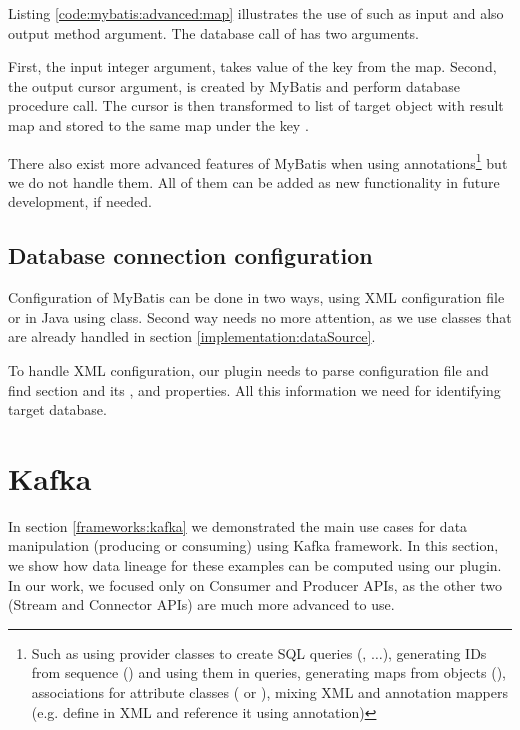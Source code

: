 Listing \ref{code:mybatis:advanced:map} illustrates the use of such  as
input and also output method argument.
The database call of  has two arguments.

First, the input integer argument, takes value of the  key from the map.
Second, the output cursor argument, is created by MyBatis and perform database procedure call.
The cursor is then transformed to list of target object
with result map  and stored to the same map under the key .



There also exist more advanced features of MyBatis when using annotations\footnote{
  Such as using provider classes to create SQL queries (, $\ldots$),
  generating IDs from sequence () and using them in queries,
  generating maps from objects (),
  associations for attribute classes ( or ),
  mixing XML and annotation mappers (e.g. define  in XML and reference it
  using  annotation)}
but we do not handle them. All of them can be added as new functionality in future development,
if needed.




\subsection{Database connection configuration}

Configuration of MyBatis can be done in two ways, using XML configuration file
or in Java using  class. Second way needs no more attention,
as we use  classes that are already handled in section \ref{implementation:dataSource}.

To handle XML configuration, our plugin needs to parse configuration file and find 
section and its ,  and  properties. All this
information we need for identifying target database.




\section{Kafka}

In section \ref{frameworks:kafka} we demonstrated the main use cases
for data manipulation (producing or consuming) using Kafka framework.
In this section, we show how data lineage for these examples can be computed
using our plugin. In our work, we focused only on Consumer and Producer APIs,
as the other two (Stream and Connector APIs) are much more advanced to use.

